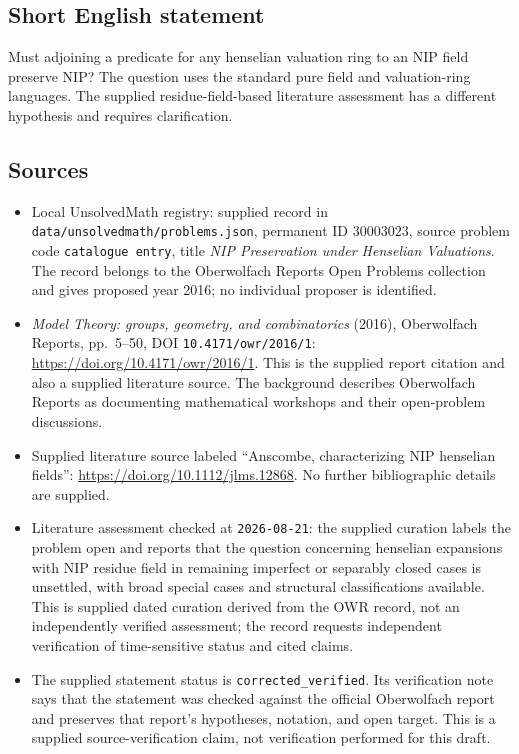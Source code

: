 \documentclass[11pt]{article}
\begin{document}
\subsection{Short English statement}
Must adjoining a predicate for any henselian valuation ring to an NIP field preserve NIP? The question uses the standard pure field and valuation-ring languages. The supplied residue-field-based literature assessment has a different hypothesis and requires clarification.
\subsection{Sources}
\begin{itemize}
\item Local UnsolvedMath registry: supplied record in \texttt{data/unsolvedmath/problems.json}, permanent ID \(30003023\), source problem code \texttt{catalogue entry}, title \emph{NIP Preservation under Henselian Valuations}. The record belongs to the Oberwolfach Reports Open Problems collection and gives proposed year 2016; no individual proposer is identified.
\item \emph{Model Theory: groups, geometry, and combinatorics} (2016), Oberwolfach Reports, pp.\ 5--50, DOI \texttt{10.4171/owr/2016/1}: \url{https://doi.org/10.4171/owr/2016/1}. This is the supplied report citation and also a supplied literature source. The background describes Oberwolfach Reports as documenting mathematical workshops and their open-problem discussions.
\item Supplied literature source labeled ``Anscombe, characterizing NIP henselian fields'': \url{https://doi.org/10.1112/jlms.12868}. No further bibliographic details are supplied.
\item Literature assessment checked at \texttt{2026-08-21}: the supplied curation labels the problem open and reports that the question concerning henselian expansions with NIP residue field in remaining imperfect or separably closed cases is unsettled, with broad special cases and structural classifications available. This is supplied dated curation derived from the OWR record, not an independently verified assessment; the record requests independent verification of time-sensitive status and cited claims.
\item The supplied statement status is \texttt{corrected\_verified}. Its verification note says that the statement was checked against the official Oberwolfach report and preserves that report's hypotheses, notation, and open target. This is a supplied source-verification claim, not verification performed for this draft.
\end{itemize}
\end{document}
